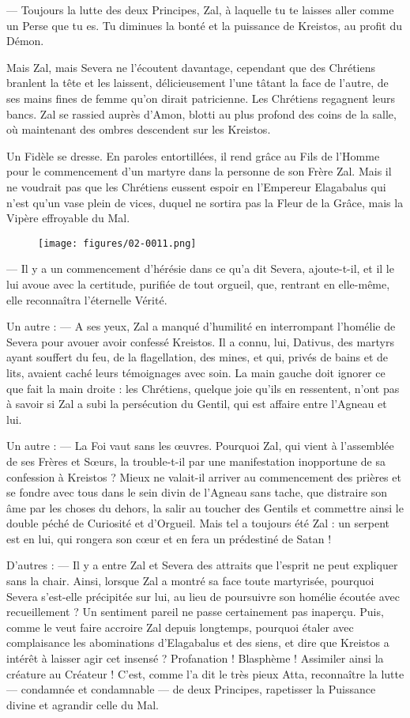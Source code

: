 \documentclass[a4paper, 11pt, oneside, polutonikogreek, french]{article}
\begin{document}
--- Toujours la lutte des deux Principes, Zal, à laquelle tu te laisses aller comme un Perse que tu es. Tu diminues la bonté et la puissance de Kreistos, au profit du Démon.

Mais Zal, mais Severa ne l'écoutent davantage, cependant que des Chrétiens branlent la tête et les laissent, délicieusement l'une tâtant la face de l'autre, de ses mains fines de femme qu'on dirait patricienne. Les Chrétiens regagnent leurs bancs. Zal se rassied auprès d'Amon, blotti au plus profond des coins de la salle, où maintenant des ombres descendent sur les Kreistos.

Un Fidèle se dresse. En paroles entortillées, il rend grâce au Fils de l'Homme pour le commencement d'un martyre dans la personne de son Frère Zal. Mais il ne voudrait pas que les Chrétiens eussent espoir en l'Empereur Elagabalus qui n'est qu'un vase plein de vices, duquel ne sortira pas la Fleur de la Grâce, mais la Vipère effroyable du Mal.
\begin{figure}[H]
\centering
\texttt{[image: figures/02-0011.png]}
\end{figure}
--- Il y a un commencement d'hérésie dans ce qu'a dit Severa, ajoute-t-il, et il le lui avoue avec la certitude, purifiée de tout orgueil, que, rentrant en elle-même, elle reconnaîtra l'éternelle Vérité.

Un autre : --- A ses yeux, Zal a manqué d'humilité en interrompant l'homélie de Severa pour avouer avoir confessé Kreistos. Il a connu, lui, Dativus, des martyrs ayant souffert du feu, de la flagellation, des mines, et qui, privés de bains et de lits, avaient caché leurs témoignages avec soin. La main gauche doit ignorer ce que fait la main droite : les Chrétiens, quelque joie qu'ils en ressentent, n'ont pas à savoir si Zal a subi la persécution du Gentil, qui est affaire entre l'Agneau et lui.

Un autre : --- La Foi vaut sans les œuvres. Pourquoi Zal, qui vient à l'assemblée de ses Frères et Sœurs, la trouble-t-il par une manifestation inopportune de sa confession à Kreistos ? Mieux ne valait-il arriver au commencement des prières et se fondre avec tous dans le sein divin de l'Agneau sans tache, que distraire son âme par les choses du dehors, la salir au toucher des Gentils et commettre ainsi le double péché de Curiosité et d'Orgueil. Mais tel a toujours été Zal : un serpent est en lui, qui rongera son cœur et en fera un prédestiné de Satan !

D'autres : --- Il y a entre Zal et Severa des attraits que l'esprit ne peut expliquer sans la chair. Ainsi, lorsque Zal a montré sa face toute martyrisée, pourquoi Severa s'est-elle précipitée sur lui, au lieu de poursuivre son homélie écoutée avec recueillement ? Un sentiment pareil ne passe certainement pas inaperçu. Puis, comme le veut faire accroire Zal depuis longtemps, pourquoi étaler avec complaisance les abominations d'Elagabalus et des siens, et dire que Kreistos a intérêt à laisser agir cet insensé ? Profanation ! Blasphème ! Assimiler ainsi la créature au Créateur ! C'est, comme l'a dit le très pieux Atta, reconnaître la lutte --- condamnée et condamnable --- de deux Principes, rapetisser la Puissance divine et agrandir celle du Mal.
\end{document}
